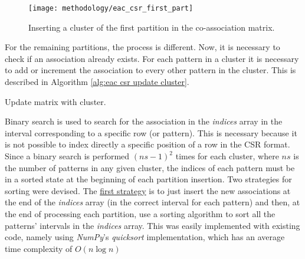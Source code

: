 \begin{figure}[hbtp]
\centering
\texttt{[image: methodology/eac\_csr\_first\_part]}
\caption{Inserting a cluster of the first partition in the co-association matrix.}
\label{fig:first part}
\end{figure}

For the remaining partitions, the process is different.
Now, it is necessary to check if an association already exists.
For each pattern in a cluster it is necessary to add or increment the association to every other pattern in the cluster.
This is described in Algorithm \ref{alg:eac csr update cluster}.


\begin{algorithm}
\caption{Update matrix with cluster.}\label{alg:eac csr update cluster}
\begin{algorithmic}[1]
		\Else
            \EndIf
		\EndIf
	\EndFor
\EndFor
\EndProcedure
\end{algorithmic}
\end{algorithm}

Binary search is used to search for the association in the \emph{indices} array in the interval corresponding to a specific row (or pattern).
This is necessary because it is not possible to index directly a specific position of a row in the CSR format.
Since a binary search is performed $(ns - 1)^2$ times for each cluster, where $ns$ is the number of patterns in any given cluster, the indices of each pattern must be in a sorted state at the beginning of each partition insertion.
Two strategies for sorting were devised.
The \underline{first strategy} is to just insert the new associations at the end of the \emph{indices} array (in the correct interval for each pattern) and then, at the end of processing each partition, use a sorting algorithm to sort all the patterns' intervals in the \emph{indices} array.
This was easily implemented with existing code, namely using \emph{NumPy}'s \emph{quicksort} implementation, which has an average time complexity of $O(n \log n)$

